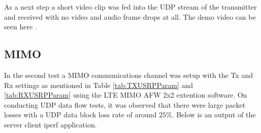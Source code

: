 As a next step a short video clip was fed into the UDP stream of the transmitter and received with no video and audio frame drops at all. The demo video can be seen here \cite{}.

\subsection{MIMO}\label{ssec:MIMOOTA}

In the second test a MIMO communications channel was setup with the Tx and Rx settings as mentioned in Table \ref{tab:TXUSRPParam} and \ref{tab:RXUSRPParam} using the LTE MIMO AFW 2x2 extention software. On conducting UDP data flow tests, it was observed that there were large packet losses with a UDP data block loss rate of around $25\%$. Below is an output of the server client iperf application.


